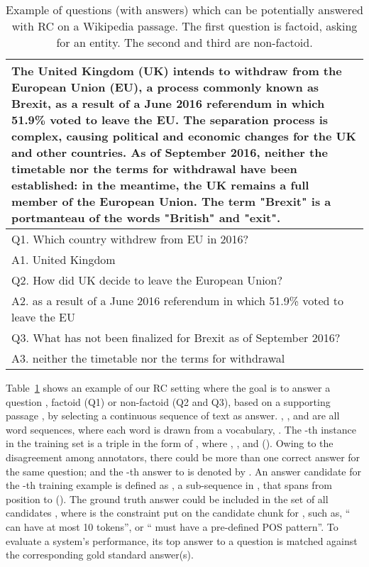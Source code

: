 \documentclass[letterpaper]{article}
\begin{document}
\begin{table}
\caption{{Example of questions (with answers) which can be potentially answered with RC on a Wikipedia passage. The first question is factoid, asking for an entity. The second and third are non-factoid.}}
\label{example}
\centering
\scriptsize
\begin{tabular}{|p{8cm}|}
\hline
The United Kingdom (UK) intends to withdraw from the European Union (EU), a process commonly known as Brexit, as a result of a June 2016 referendum in which 51.9\% voted to leave the EU. The separation process is complex, causing political and economic changes for the UK and other countries. As of September 2016, neither the timetable nor the terms for withdrawal have been established: in the meantime, the UK remains a full member of the European Union. The term "Brexit" is a portmanteau of the words "British" and "exit". \\
\hline
Q1. Which country withdrew from EU in 2016?\\A1. United Kingdom\\ \hline Q2. How did UK decide to leave the European Union? \\
A2. as a result of a June 2016 referendum in which 51.9\% voted to leave the EU \\ \hline
Q3. What has not been finalized for Brexit as of September 2016? \\
A3. neither the timetable nor the terms for withdrawal \\ \hline
\end{tabular}
\end{table}










Table~\ref{example} shows an example of our RC setting where the goal is to answer a question , factoid (Q1) or non-factoid (Q2 and Q3), based on a supporting passage , by selecting a continuous sequence of text  as answer. , , and  are all word sequences, where each word is drawn from a vocabulary, .
The -th instance in the training set is a triple in the form of , where , , and  (). Owing to the disagreement among annotators, there could be more than one correct answer for the same question; and the -th answer to  is denoted by . An answer candidate for the -th training example is defined as , a sub-sequence in , that spans from position  to  (). The ground truth answer  could be included in the set of all candidates , where  is the constraint put on the candidate chunk for , such as, `` can have at most 10 tokens'', or `` must have a pre-defined POS pattern''. To evaluate a system's performance, its top answer to a question is matched against the corresponding gold standard answer(s).
\end{document}
